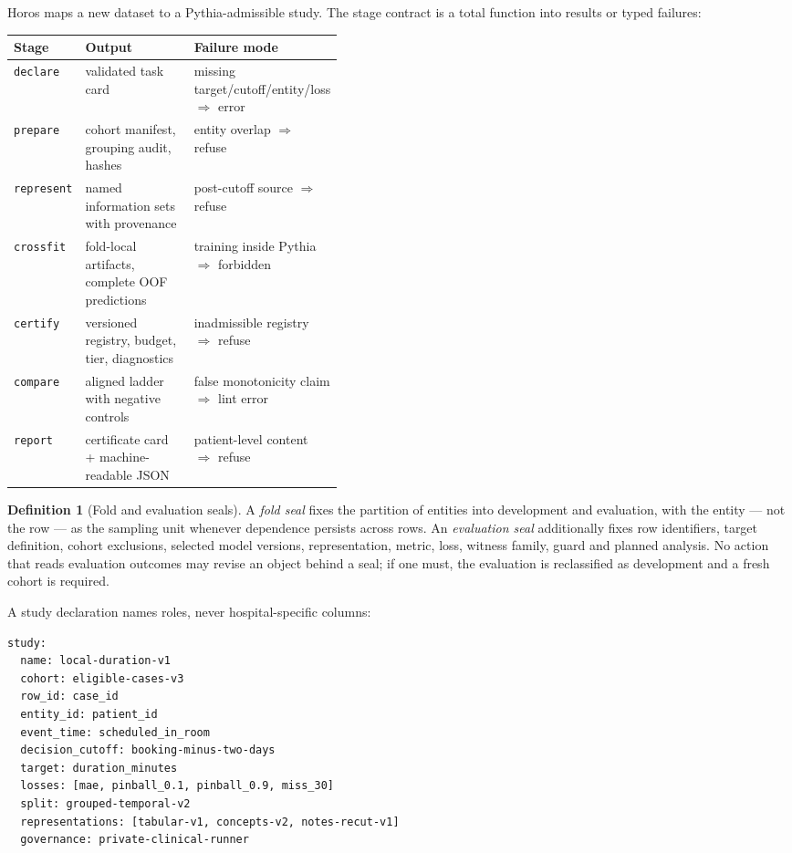 \documentclass[11pt,a4paper]{article}
\theoremstyle{definition}
\newtheorem{definition}[theorem]{Definition}
\theoremstyle{remark}
\newcommand{\code}[1]{\texttt{\small#1}}
\begin{document}
Horos maps a new dataset to a Pythia-admissible study. The stage contract is a total function into results or typed failures:

\begin{center}
\small
\begin{tabular}{@{}llp{0.42\linewidth}@{}}
\toprule
Stage & Output & Failure mode \\
\midrule
\code{declare} & validated task card & missing target/cutoff/entity/loss $\Rightarrow$ error \\
\code{prepare} & cohort manifest, grouping audit, hashes & entity overlap $\Rightarrow$ refuse \\
\code{represent} & named information sets with provenance & post-cutoff source $\Rightarrow$ refuse \\
\code{crossfit} & fold-local artifacts, complete OOF predictions & training inside Pythia $\Rightarrow$ forbidden \\
\code{certify} & versioned registry, budget, tier, diagnostics & inadmissible registry $\Rightarrow$ refuse \\
\code{compare} & aligned ladder with negative controls & false monotonicity claim $\Rightarrow$ lint error \\
\code{report} & certificate card + machine-readable JSON & patient-level content $\Rightarrow$ refuse \\
\bottomrule
\end{tabular}
\end{center}

\begin{definition}[Fold and evaluation seals]\label{def:seals}
A \emph{fold seal} fixes the partition of entities into development and evaluation, with the entity --- not the row --- as the sampling unit whenever dependence persists across rows. An \emph{evaluation seal} additionally fixes row identifiers, target definition, cohort exclusions, selected model versions, representation, metric, loss, witness family, guard and planned analysis. No action that reads evaluation outcomes may revise an object behind a seal; if one must, the evaluation is reclassified as development and a fresh cohort is required.
\end{definition}

A study declaration names roles, never hospital-specific columns:

\begin{verbatim}
study:
  name: local-duration-v1
  cohort: eligible-cases-v3
  row_id: case_id
  entity_id: patient_id
  event_time: scheduled_in_room
  decision_cutoff: booking-minus-two-days
  target: duration_minutes
  losses: [mae, pinball_0.1, pinball_0.9, miss_30]
  split: grouped-temporal-v2
  representations: [tabular-v1, concepts-v2, notes-recut-v1]
  governance: private-clinical-runner
\end{verbatim}
\end{document}
